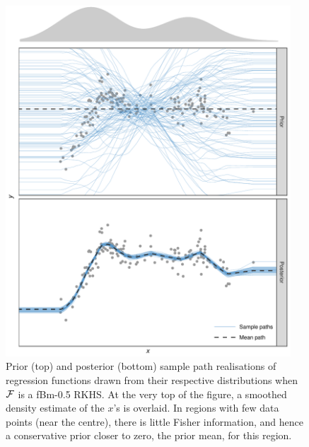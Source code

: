 \begin{figure}[p]
  \centering
  \includegraphics[width=0.95\textwidth]{figure/04-post_reg_prior_post}
  \caption{Prior (top) and posterior (bottom) sample path realisations of regression functions drawn from their respective distributions when ${\mathcal F}$ is a fBm-0.5 RKHS. At the very top of the figure, a smoothed density estimate of the $x$'s is overlaid. In regions with few data points (near the centre), there is little Fisher information, and hence a conservative prior closer to zero, the prior mean, for this region.}
\end{figure}

